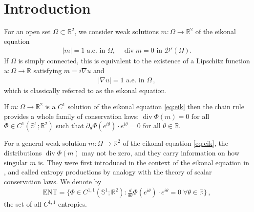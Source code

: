 \documentclass[fleqn
]{article}
\numberwithin{equation}{section}
\newcommand{\R}{{\mathbb R}}
\DeclareMathOperator{\dv}{div}
\theoremstyle{definition}
\begin{document}
\section{Introduction}


For an open set $\Omega\subset\R^2$, 
we consider weak solutions $m\colon\Omega\to\R^2$ of the eikonal equation
\begin{align}\label{eq:eik}
|m|=1\text{ a.e. in }\Omega,\quad \dv m =0\text{ in }\mathcal D'(\Omega).
\end{align}
If $\Omega$ is simply connected, this is equivalent to the existence of a Lipschitz function $u\colon\Omega\to \R$ satisfying
 $m=i\nabla u$ and  
 \begin{align*}
 |\nabla u|=1 \text{ a.e. in }\Omega\,,
 \end{align*}
 which is classically referred to as the eikonal equation.


If $m\colon\Omega\to\R^2$ is a $C^1$ solution of the eikonal equation \eqref{eq:eik}
then the chain rule provides a whole family of conservation laws:
$\dv\Phi(m)=0$ for all 
$\Phi\in C^1(\mathbb S^1;\R^2)$
 such that 
 $\partial_\theta\Phi(e^{i\theta})\cdot e^{i\theta} =0$ for all $\theta\in\R$.
 
For a general weak solution $m\colon\Omega\to\R^2$ of the eikonal equation \eqref{eq:eik},
 the distributions $\dv\Phi(m)$ 
 may not be zero,
 and they carry information on how singular $m$ is.
They were first introduced in the context of the eikonal equation in \cite{dkmo01}, 
and called entropy productions by analogy with the theory of scalar conservation laws.
We denote by
\begin{align}
\mathrm{ENT}=
\big\lbrace
\Phi\in C^{1,1}(\mathbb S^1;\R^2)\colon\frac{d}{d\theta}\Phi(e^{i\theta})\cdot e^{i\theta}=0\;\forall\theta\in\R\big\rbrace\,,
\end{align}
the set of all $C^{1,1}$ entropies.
\end{document}
